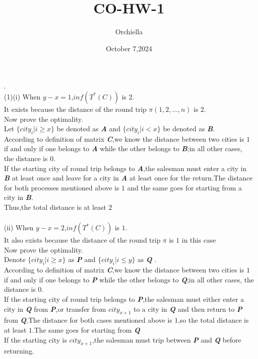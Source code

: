 \documentclass{article}
\title{CO-HW-1}
\author{Orchiella}
\date{October 7,2024}
\begin{document}
.\\
(1)(i) When $y-x=1$,$ inf(T^*(C)) $ is $2$.\\
It exists because the distance of the round trip $ \pi (1,2,...,n) $ is $2$.\\
Now prove the optimality.\\
Let $\{city_i | i \geq x\}$ be denoted as \textbf{\textit{A}} and $\{city_i | i < x\}$ be denoted as \textbf{\textit{B}}.\\
According to definition of matrix \textit{\textbf{C}},we know the distance between two cities is $1$ if and only if one belongs to \textit{\textbf{A}} while the other belongs to \textbf{\textit{B}};in all other cases, the distance is $0$.\\
If the starting city of round trip belongs to \textbf{\textit{A}},the salesman must enter a city in \textbf{\textit{B}} at least once and leave for a city in \textbf{\textit{A}} at least once for the return.The distance for both processes mentioned above is $1$ and the same goes for starting from a city in \textbf{\textit{B}}.\\
Thus,the total distance is at least $2$\\
\\
(ii) When $y-x = 2$,$inf(T^*(C))$ is $1$.\\
It also exists because the distance of the round trip $\pi$ is $1$ in this case\\
Now prove the optimality.\\
Denote $\{city_i | i \geq x\}$ as \textbf{\textit{P}} and $\{city_i | i \leq y\}$ as \textbf{\textit{Q}} .\\
According to definition of matrix \textit{\textbf{C}},we know the distance between two cities is $1$ if and only if one belongs to \textit{\textbf{P}} while the other belongs to \textbf{\textit{Q}};in all other cases, the distance is $0$.\\
If the starting city of round trip belongs to \textbf{\textit{P}},the salesman must either enter a city in \textit{\textbf{Q}} from \textit{\textbf{P}},or transfer from $city_{x+1}$ to a city in \textbf{\textit{Q}} and then return to \textbf{\textit{P}} from \textbf{\textit{Q}},The distance for both cases mentioned above is $1$,so the total distance is at least $1$.The same goes for starting from \textbf{\textit{Q}}\\
If the starting city is $city_{x+1}$,the salesman must trip between \textit{\textbf{P}} and \textbf{\textit{Q}} before returning.\\
\end{document}
